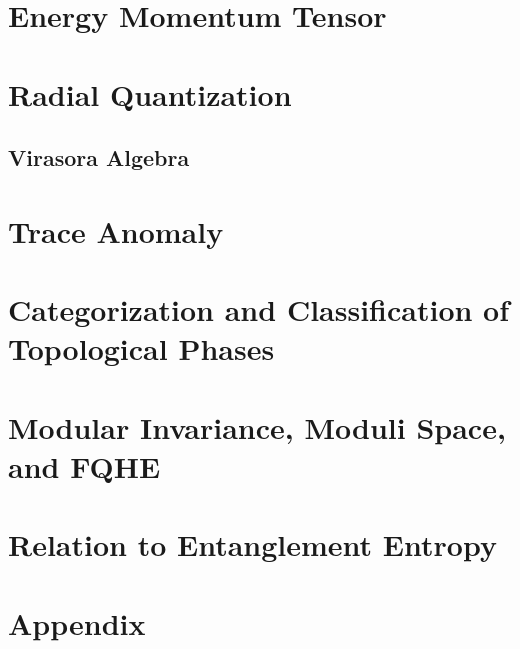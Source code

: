 \documentclass[10pt,nofootinbib]{revtex4}
\begin{document}
\section{Energy Momentum Tensor}

\section{Radial Quantization}
	\subsection{Virasora Algebra}

\section{Trace Anomaly}

\section{Categorization and Classification of Topological Phases}

\section{Modular Invariance, Moduli Space, and FQHE}

\section{Relation to Entanglement Entropy}

\section{Appendix}
\end{document}
